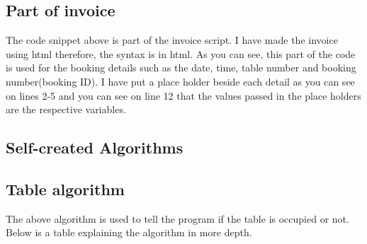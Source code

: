 \subsection{Part of invoice}

The code snippet above is part of the invoice script. I have made the invoice using html therefore, the syntax is in html. As you can see, this part of the code is used for the booking details such as the date, time, table number and booking number(booking ID). I have put a place holder beside each detail as you can see on lines 2-5 and you can see on line 12 that the values passed in the place holders are the respective variables.

\newpage
\subsection{Self-created Algorithms}

\subsection{Table algorithm}
The above algorithm is used to tell the program if the table is occupied or not. Below is a table explaining the algorithm in more depth.

